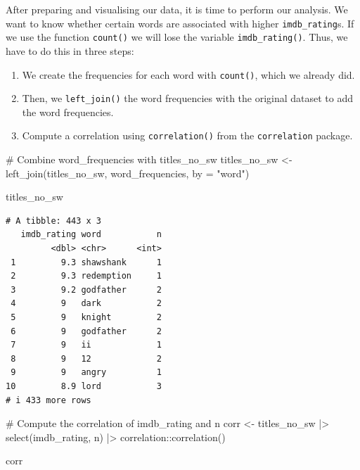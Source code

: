 \documentclass[
  letterpaper,
]{krantz}
\makeatletter
\newenvironment{Shaded}{\begin{snugshade}}{\end{snugshade}}
\newcommand{\AttributeTok}[1]{\textcolor[rgb]{0.40,0.45,0.13}{#1}}
\newcommand{\CommentTok}[1]{\textcolor[rgb]{0.37,0.37,0.37}{#1}}
\newcommand{\FunctionTok}[1]{\textcolor[rgb]{0.28,0.35,0.67}{#1}}
\newcommand{\NormalTok}[1]{\textcolor[rgb]{0.00,0.23,0.31}{#1}}
\newcommand{\OtherTok}[1]{\textcolor[rgb]{0.00,0.23,0.31}{#1}}
\newcommand{\SpecialCharTok}[1]{\textcolor[rgb]{0.37,0.37,0.37}{#1}}
\newcommand{\StringTok}[1]{\textcolor[rgb]{0.13,0.47,0.30}{#1}}
\newenvironment{kframe}{%
\medskip{}
\setlength{\fboxsep}{.8em}
 \def\at@end@of@kframe{}%
 \ifinner\ifhmode%
  \def\at@end@of@kframe{\end{minipage}}%
  \begin{minipage}{\columnwidth}%
 \fi\fi%
 \def\FrameCommand##1{\hskip\@totalleftmargin \hskip-\fboxsep
 \colorbox{shadecolor}{##1}\hskip-\fboxsep
     \hskip-\linewidth \hskip-\@totalleftmargin \hskip\columnwidth}%
 \MakeFramed {\advance\hsize-\width
   \@totalleftmargin\z@ \linewidth\hsize
   \@setminipage}}%
 {\par\unskip\endMakeFramed%
 \at@end@of@kframe}
\renewenvironment{Shaded}{\begin{kframe}}{\end{kframe}}
\makeatother
\begin{document}
After preparing and visualising our data, it is time to perform our
analysis. We want to know whether certain words are associated with
higher \texttt{imdb\_rating}s. If we use the function \texttt{count()}
we will lose the variable \texttt{imdb\_rating()}. Thus, we have to do
this in three steps:

\begin{enumerate}
\def\labelenumi{\arabic{enumi}.}
\item
  We create the frequencies for each word with \texttt{count()}, which
  we already did.
\item
  Then, we \texttt{left\_join()} the word frequencies with the original
  dataset to add the word frequencies.
\item
  Compute a correlation using \texttt{correlation()} from the
  \texttt{correlation} package.
\end{enumerate}

\begin{Shaded}
\begin{Highlighting}[]
\CommentTok{\# Combine word\_frequencies with titles\_no\_sw}
\NormalTok{titles\_no\_sw }\OtherTok{\textless{}{-}} \FunctionTok{left\_join}\NormalTok{(titles\_no\_sw, word\_frequencies,}
                          \AttributeTok{by =} \StringTok{"word"}\NormalTok{)}

\NormalTok{titles\_no\_sw}
\end{Highlighting}
\end{Shaded}

\begin{verbatim}
# A tibble: 443 x 3
   imdb_rating word           n
         <dbl> <chr>      <int>
 1         9.3 shawshank      1
 2         9.3 redemption     1
 3         9.2 godfather      2
 4         9   dark           2
 5         9   knight         2
 6         9   godfather      2
 7         9   ii             1
 8         9   12             2
 9         9   angry          1
10         8.9 lord           3
# i 433 more rows
\end{verbatim}

\begin{Shaded}
\begin{Highlighting}[]
\CommentTok{\# Compute the correlation of imdb\_rating and n}
\NormalTok{corr }\OtherTok{\textless{}{-}}
\NormalTok{  titles\_no\_sw }\SpecialCharTok{|\textgreater{}}
  \FunctionTok{select}\NormalTok{(imdb\_rating, n) }\SpecialCharTok{|\textgreater{}}
\NormalTok{  correlation}\SpecialCharTok{::}\FunctionTok{correlation}\NormalTok{()}

\NormalTok{corr}
\end{Highlighting}
\end{Shaded}
\end{document}
